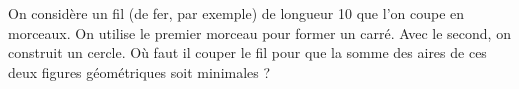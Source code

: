 \begin{exercice}\label{exoJanvier014}

On considère un fil (de fer, par exemple) de longueur \unit{10}{\centi\meter} que l'on coupe en morceaux. On utilise le premier morceau pour former un carré. Avec le second, on construit un cercle. Où faut il couper le fil pour que la somme des aires de ces deux figures géométriques soit minimales ?

\end{exercice}
